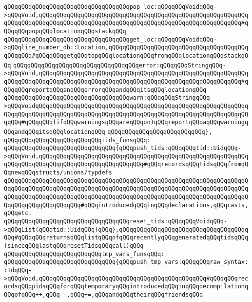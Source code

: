 \verb|qQQqqQQqqQQqqQQqqQQqqQQqqQQqqQQqqQQqpop_loc:qQQqqQQqVoidqQQq->qQQqVoid,qQQqqQQqqQQqqQQqqQQqqQQqqQQqqQQqqQQqqQQqqQQqqQQqqQQqqQQqqQQqqQQqqQQqqQQqqQQqqQQqqQQqqQQqqQQqqQQqqQQqqQQqqQQqqQQqqQQqqQQqqQQqqQQq#qQQqqQQqpopqQQqlocationqQQqstackqQQq|\newline
\verb|qQQqqQQqqQQqqQQqqQQqqQQqqQQqqQQqqQQqget_loc:qQQqqQQqVoidqQQq->qQQqline_number_db::Location,qQQqqQQqqQQqqQQqqQQqqQQqqQQqqQQqqQQqqQQqqQQqqQQq#qQQqqQQqgetqQQqtopqQQqlocationqQQqfromqQQqlocationqQQqstackqQQq|\newline
\verb|qQQqqQQqqQQqqQQqqQQqqQQqqQQqqQQqqQQqerror:qQQqqQQqStringqQQq->qQQqVoid,qQQqqQQqqQQqqQQqqQQqqQQqqQQqqQQqqQQqqQQqqQQqqQQqqQQqqQQqqQQqqQQqqQQqqQQqqQQqqQQqqQQqqQQqqQQqqQQqqQQqqQQqqQQqqQQqqQQqqQQqqQQqqQQq#qQQqqQQqreportqQQqanqQQqerrorqQQqandqQQqitsqQQqlocationqQQq|\newline
\verb|qQQqqQQqqQQqqQQqqQQqqQQqqQQqqQQqqQQqwarn:qQQqqQQqStringqQQq->qQQqVoidqQQqqQQqqQQqqQQqqQQqqQQqqQQqqQQqqQQqqQQqqQQqqQQqqQQqqQQqqQQqqQQqqQQqqQQqqQQqqQQqqQQqqQQqqQQqqQQqqQQqqQQqqQQqqQQqqQQqqQQqqQQqqQQqqQQqqQQq#qQQqqQQq(ifqQQqwarningsqQQqareqQQqon)qQQqreportqQQqaqQQqwarningqQQqandqQQqitsqQQqlocationqQQq|\newline
\verb|qQQqqQQqqQQqqQQqqQQqqQQqqQQq},|\newline
\newline
\verb|qQQqqQQqqQQqqQQqqQQqqQQqqQQqtids_funsqQQq:|\newline
\verb|qQQqqQQqqQQqqQQqqQQqqQQqqQQqqQQq{qQQqpush_tids:qQQqqQQqtid::UidqQQq->qQQqVoid,qQQqqQQqqQQqqQQqqQQqqQQqqQQqqQQqqQQqqQQqqQQqqQQqqQQqqQQqqQQqqQQqqQQqqQQqqQQqqQQqqQQqqQQqqQQqqQQqqQQq#qQQqrecordsqQQqtidsqQQqfromqQQqnewqQQqstructs/unions/typdefs|\newline
\verb|qQQqqQQqqQQqqQQqqQQqqQQqqQQqqQQqqQQqqQQqqQQqqQQqqQQqqQQqqQQqqQQqqQQqqQQqqQQqqQQqqQQqqQQqqQQqqQQqqQQqqQQqqQQqqQQqqQQqqQQqqQQqqQQqqQQqqQQqqQQqqQQqqQQqqQQqqQQqqQQqqQQqqQQqqQQqqQQqqQQqqQQqqQQqqQQqqQQqqQQqqQQqqQQqqQQqqQQqqQQqqQQqqQQqqQQq#qQQqintroducedqQQqinqQQqdeclarations,qQQqcasts,qQQqetc.|\newline
\verb|qQQqqQQqqQQqqQQqqQQqqQQqqQQqqQQqqQQqreset_tids:qQQqqQQqVoidqQQq->qQQqList(qQQqtid::UidqQQq)qQQq},qQQqqQQqqQQqqQQqqQQqqQQqqQQqqQQqqQQqqQQq#qQQqqQQqreturnsqQQqlistqQQqofqQQqrecentlyqQQqgeneratedqQQqtidsqQQq(sinceqQQqlastqQQqresetTidsqQQqcall)qQQq|\newline
\newline
\verb|qQQqqQQqqQQqqQQqqQQqqQQqqQQqtmp_vars_funsqQQq:|\newline
\verb|qQQqqQQqqQQqqQQqqQQqqQQqqQQqqQQq{qQQqpush_tmp_vars:qQQqqQQqraw_syntax::IdqQQq->qQQqVoid,qQQqqQQqqQQqqQQqqQQqqQQqqQQqqQQqqQQqqQQqqQQqqQQq#qQQqqQQqrecordsqQQqpidsqQQqforqQQqtemporaryqQQqintroducedqQQqinqQQqdecompilationqQQqofqQQq++,qQQq--,qQQq+=,qQQqandqQQqtheirqQQqfriendsqQQq|\newline
